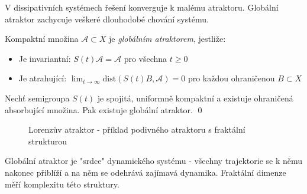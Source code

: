 \begin{motivation}
V dissipativních systémech řešení konverguje k malému atraktoru. Globální atraktor zachycuje veškeré dlouhodobé chování systému.
\end{motivation}

\begin{definition}
Kompaktní množina $\mathcal{A} \subset X$ je \emph{globálním atraktorem}, jestliže:
\begin{itemize}
\item Je invariantní: $S(t)\mathcal{A} = \mathcal{A}$ pro všechna $t \geq 0$
\item Je atrahující: $\lim_{t\to\infty} \text{dist}(S(t)B, \mathcal{A}) = 0$ pro každou ohraničenou $B \subset X$
\end{itemize}
\end{definition}

\begin{theorem}
Nechť semigroupa $S(t)$ je spojitá, uniformně kompaktní a existuje ohraničená absorbující množina. Pak existuje globální atraktor.
\qed
\end{theorem}

\begin{figure}[htbp]
\centering
{}
\caption{Lorenzův atraktor - příklad podivného atraktoru s fraktální strukturou}
\label{fig:lorenz-attractor}
\end{figure}

\begin{intuition}
Globální atraktor je "srdce" dynamického systému - všechny trajektorie se k němu nakonec přiblíží a na něm se odehrává zajímavá dynamika. Fraktální dimenze měří komplexitu této struktury.
\end{intuition}

